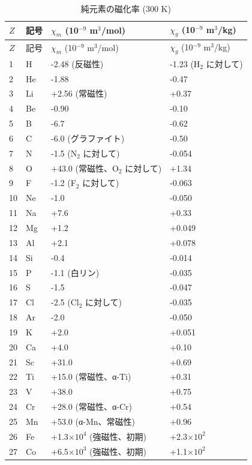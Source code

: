 \documentclass[11pt,a4paper]{article}
\theoremstyle{remark}
\begin{document}
	\begin{longtable}{p{0.6cm}p{1.2cm}p{2.5cm}p{2.5cm}}
		\caption{純元素の磁化率 (300 K)} \label{tab:magnetic-susceptibility-all} \\
		\toprule
		\(Z\) & 記号 & \(\chi_m\) (10\(^{-9}\) m\(^3\)/mol) & \(\chi_g\) (10\(^{-9}\) m\(^3\)/kg) \\
		\midrule
		\endfirsthead
		\toprule
		\(Z\) & 記号 & \(\chi_m\) (10\(^{-9}\) m\(^3\)/mol) & \(\chi_g\) (10\(^{-9}\) m\(^3\)/kg) \\
		\midrule
		\endhead
		1  & H  & -2.48 (反磁性) & -1.23 (H\(_2\) に対して) \\
		2  & He & -1.88 & -0.47 \\
		3  & Li & +2.56 (常磁性) & +0.37 \\
		4  & Be & -0.90 & -0.10 \\
		5  & B  & -6.7 & -0.62 \\
		6  & C  & -6.0 (グラファイト) & -0.50 \\
		7  & N  & -1.5 (N\(_2\) に対して) & -0.054 \\
		8  & O  & +43.0 (常磁性、O\(_2\) に対して) & +1.34 \\
		9  & F  & -1.2 (F\(_2\) に対して) & -0.063 \\
		10 & Ne & -1.0 & -0.050 \\
		11 & Na & +7.6 & +0.33 \\
		12 & Mg & +1.2 & +0.049 \\
		13 & Al & +2.1 & +0.078 \\
		14 & Si & -0.4 & -0.014 \\
		15 & P  & -1.1 (白リン) & -0.035 \\
		16 & S  & -1.5 & -0.047 \\
		17 & Cl & -2.5 (Cl\(_2\) に対して) & -0.035 \\
		18 & Ar & -2.0 & -0.050 \\
		19 & K  & +2.0 & +0.051 \\
		20 & Ca & +4.0 & +0.10 \\
		21 & Sc & +31.0 & +0.69 \\
		22 & Ti & +15.0 (常磁性、α-Ti) & +0.31 \\
		23 & V  & +38.0 & +0.75 \\
		24 & Cr & +28.0 (常磁性、α-Cr) & +0.54 \\
		25 & Mn & +53.0 (α-Mn、常磁性) & +0.96 \\
		26 & Fe & +1.3\(\times10^4\) (強磁性、初期) & +2.3\(\times10^2\) \\
		27 & Co & +6.5\(\times10^3\) (強磁性、初期) & +1.1\(\times10^2\) \\

\end{longtable}
\end{document}
